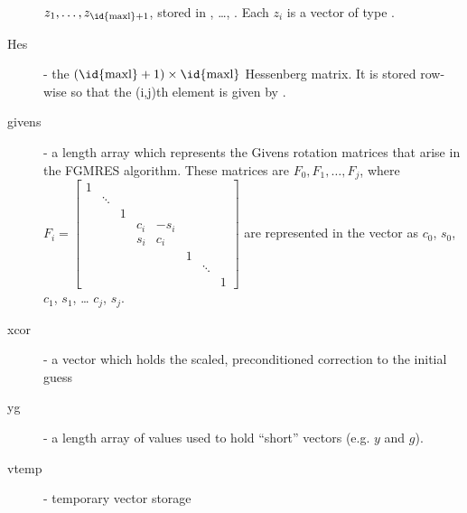 \begin{description}
    $z_1, \ldots, z_{\text{\id{maxl}}+1}$, stored in ,
    \ldots, . Each $z_i$ is a vector of type {\nvector}.
  \item[Hes] - the $(\text{\id{maxl}}+1)\times\text{\id{maxl}}$
    Hessenberg matrix. It is stored row-wise so that the (i,j)th
    element is given by . 
  \item[givens] - a length  array which represents the
    Givens rotation matrices that arise in the FGMRES algorithm. These
    matrices are $F_0, F_1, \ldots, F_j$, where
    $F_i = \begin{bmatrix}
      1 &        &   &     &      &   &        &   \\
        & \ddots &   &     &      &   &        &   \\
        &        & 1 &     &      &   &        &   \\
        &        &   & c_i & -s_i &   &        &   \\
        &        &   & s_i &  c_i &   &        &   \\
        &        &   &     &      & 1 &        &   \\
        &        &   &     &      &   & \ddots &   \\
        &        &   &     &      &   &        & 1\end{bmatrix}$
    are represented in the  vector as 
    $c_0$,  $s_0$,  $c_1$,
     $s_1$, \ldots {} $c_j$,
     $s_j$.
  \item[xcor] - a vector which holds the scaled, preconditioned
    correction to the initial guess 
  \item[yg] - a length  array of  values
    used to hold ``short'' vectors (e.g. $y$ and $g$).
  \item[vtemp] - temporary vector storage
\end{description}


